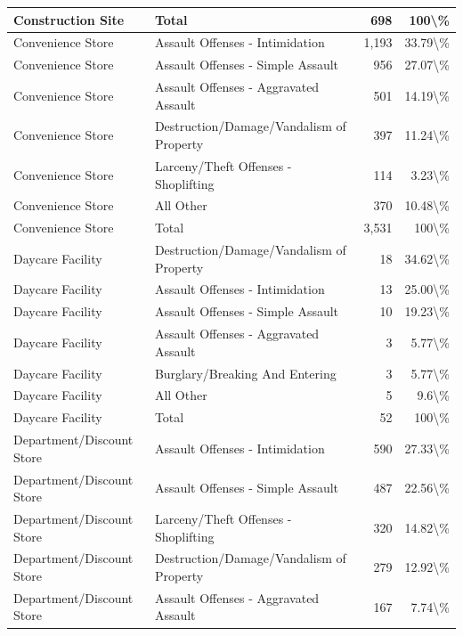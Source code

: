 \documentclass[
]{krantz}
\begin{document}
\begin{longtable}[t]{l|l|r|r}
\hline
Construction Site & Total & 698 & 100\textbackslash{}\%\\
\hline
Convenience Store & Assault Offenses - Intimidation & 1,193 & 33.79\textbackslash{}\%\\
\hline
Convenience Store & Assault Offenses - Simple Assault & 956 & 27.07\textbackslash{}\%\\
\hline
Convenience Store & Assault Offenses - Aggravated Assault & 501 & 14.19\textbackslash{}\%\\
\hline
Convenience Store & Destruction/Damage/Vandalism of Property & 397 & 11.24\textbackslash{}\%\\
\hline
Convenience Store & Larceny/Theft Offenses - Shoplifting & 114 & 3.23\textbackslash{}\%\\
\hline
Convenience Store & All Other & 370 & 10.48\textbackslash{}\%\\
\hline
Convenience Store & Total & 3,531 & 100\textbackslash{}\%\\
\hline
Daycare Facility & Destruction/Damage/Vandalism of Property & 18 & 34.62\textbackslash{}\%\\
\hline
Daycare Facility & Assault Offenses - Intimidation & 13 & 25.00\textbackslash{}\%\\
\hline
Daycare Facility & Assault Offenses - Simple Assault & 10 & 19.23\textbackslash{}\%\\
\hline
Daycare Facility & Assault Offenses - Aggravated Assault & 3 & 5.77\textbackslash{}\%\\
\hline
Daycare Facility & Burglary/Breaking And Entering & 3 & 5.77\textbackslash{}\%\\
\hline
Daycare Facility & All Other & 5 & 9.6\textbackslash{}\%\\
\hline
Daycare Facility & Total & 52 & 100\textbackslash{}\%\\
\hline
Department/Discount Store & Assault Offenses - Intimidation & 590 & 27.33\textbackslash{}\%\\
\hline
Department/Discount Store & Assault Offenses - Simple Assault & 487 & 22.56\textbackslash{}\%\\
\hline
Department/Discount Store & Larceny/Theft Offenses - Shoplifting & 320 & 14.82\textbackslash{}\%\\
\hline
Department/Discount Store & Destruction/Damage/Vandalism of Property & 279 & 12.92\textbackslash{}\%\\
\hline
Department/Discount Store & Assault Offenses - Aggravated Assault & 167 & 7.74\textbackslash{}\%\\

\end{longtable}
\end{document}
